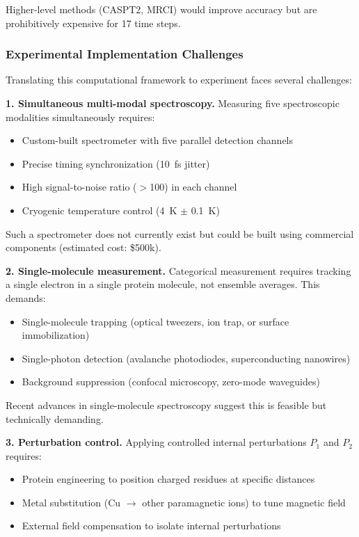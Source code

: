 \documentclass[twocolumn,10pt]{article}
\begin{document}
Higher-level methods (CASPT2, MRCI) would improve accuracy but are prohibitively 
expensive for 17 time steps.

\subsubsection{Experimental Implementation Challenges}

Translating this computational framework to experiment faces several challenges:

\textbf{1. Simultaneous multi-modal spectroscopy.} Measuring five spectroscopic 
modalities simultaneously requires:
%
\begin{itemize}
\item Custom-built spectrometer with five parallel detection channels
\item Precise timing synchronization (10~fs jitter)
\item High signal-to-noise ratio ($>$100) in each channel
\item Cryogenic temperature control (4~K $\pm$ 0.1~K)
\end{itemize}

Such a spectrometer does not currently exist but could be built using commercial 
components (estimated cost: \$500k).

\textbf{2. Single-molecule measurement.} Categorical measurement requires 
tracking a single electron in a single protein molecule, not ensemble averages. 
This demands:
%
\begin{itemize}
\item Single-molecule trapping (optical tweezers, ion trap, or surface immobilization)
\item Single-photon detection (avalanche photodiodes, superconducting nanowires)
\item Background suppression (confocal microscopy, zero-mode waveguides)
\end{itemize}

Recent advances in single-molecule spectroscopy \cite{Moerner2015} suggest this 
is feasible but technically demanding.

\textbf{3. Perturbation control.} Applying controlled internal perturbations 
$P_1$ and $P_2$ requires:
%
\begin{itemize}
\item Protein engineering to position charged residues at specific distances
\item Metal substitution (Cu $\to$ other paramagnetic ions) to tune magnetic field
\item External field compensation to isolate internal perturbations
\end{itemize}
\end{document}
